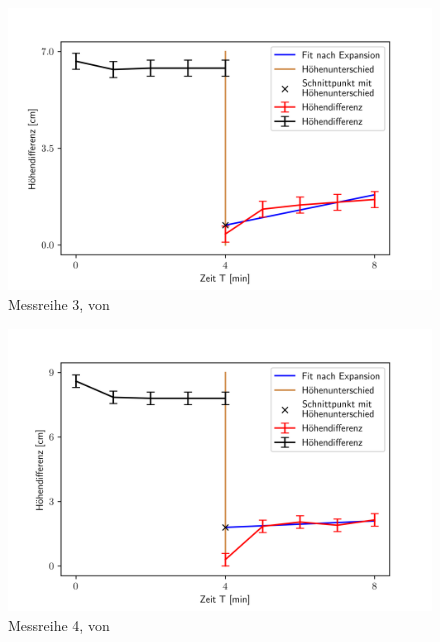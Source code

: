 \documentclass[bibliography=totocnumbered]{scrartcl}
\begin{document}
\newpage
\begin{figure}[!ht]
\centering									%
\includegraphics[width=350pt]{fotos/gpr1/Regression_M3.png}			%
\caption{Messreihe 3, von \theauthor}							%
\label{Abb: Ben 3}							%
\end{figure}
\begin{figure}[!ht]
\centering									%
\includegraphics[width=350pt]{fotos/gpr1/Regression-M4.png}			%
\caption{Messreihe 4, von \theauthor}							%
\label{Abb: Ben 4}							%
\end{figure}
	\newpage
\end{document}
